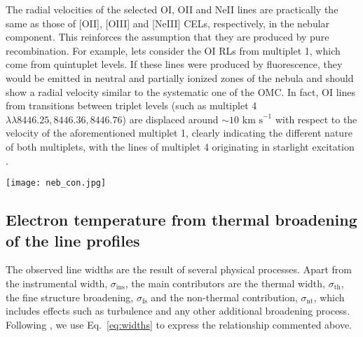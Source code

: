 \documentclass[fleqn,usenatbib]{mnras}
\begin{document}
The radial velocities of the selected  \mbox{O}\thinspace \mbox{I}, \mbox{O}\thinspace \mbox{II} and \mbox{Ne}\thinspace \mbox{II} lines are practically the same as those of \mbox{[O}\thinspace \mbox{II]}, \mbox{[O}\thinspace \mbox{III]} and \mbox{[Ne}\thinspace \mbox{III]} CELs, respectively, in the nebular component. This reinforces the assumption that they are produced by pure recombination. For example, lets consider the \mbox{O}\thinspace \mbox{I} RLs from multiplet 1, which come from quintuplet levels. If these lines were  produced by fluorescence, they would be  emitted in neutral and partially ionized zones of the nebula and should show a radial velocity similar to the systematic one of the OMC. In fact, \mbox{O}\thinspace \mbox{I} lines from transitions between triplet levels (such as multiplet 4 $\lambda \lambda 8446.25,8446.36,8446.76 $) are displaced around $\sim10 \text{ km s}^{-1}$ with respect to the velocity of the aforementioned multiplet 1, clearly indicating the different nature of both multiplets, with the lines of multiplet 4 originating in starlight excitation \citep{grandi75b}.






\begin{figure*}
\centering
\texttt{[image: neb\_con.jpg]}
\caption{Observed radial velocity of the ions as function of the ionization potential. The upper left, bottom left and bottom right panels correspond to the radial velocities derived by considering the rest-frame reference wavelength $\lambda_0$ and the observed one $\lambda$ in the heliocentric frame of reference for the nebular component of the cut 2, HH~529~II and HH~529~III, respectively. The upper right panel is defined with the difference of velocities between the nebular component and HH~529~II (subtraction of the upper and lower left panels) and rescaled using the velocity determined for H\thinspace I lines, whose rest-frame reference wavelengths $\lambda_0$ are the best determined ones.}
\label{fig:kin}
\end{figure*}





\subsection{Electron temperature from thermal broadening of the line profiles}
\label{subsec:line_widths}

The observed line widths are the result of several physical processes. Apart from the instrumental width, $\sigma_{\text{ins}}$, the main contributors are the thermal width, $ \sigma_{\text{th}}$, the fine structure broadening, $ \sigma_{\text{fs}}$ and the non-thermal contribution, $\sigma_{\text{nt}}$, which includes effects such as turbulence and any other additional broadening process. Following \citet[][hereinafter GHLD08, see their equation 2]{garciadiaz08}, we use  Eq.~\eqref{eq:widths} to express the relationship commented above. 
\end{document}
